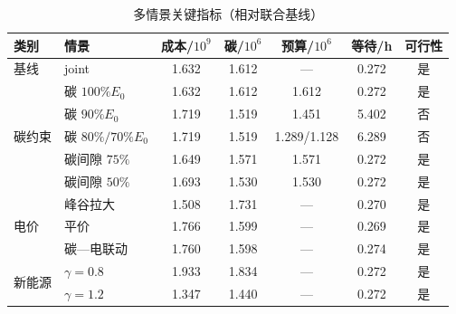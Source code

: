 \documentclass[UTF8,a4paper,zihao=-4]{ctexart}
\begin{document}
\begin{table}[H]
  \centering
  \small
  \caption{多情景关键指标（相对联合基线）}
  \label{tab:q4-scenarios}
  \small
  \setlength{\tabcolsep}{3.5pt}
  \begin{tabular}{llccccc}
    \hline
    类别 & 情景 & 成本/$10^9$ & 碳/$10^6$ & 预算/$10^6$ & 等待/h & 可行性 \\
    \hline
    基线 & joint & 1.632 & 1.612 & --- & 0.272 & 是 \\
    \hline
    \multirow{5}{*}{碳约束}
      & 碳 \(100\%E_0\) & 1.632 & 1.612 & 1.612 & 0.272 & 是 \\
      & 碳 \(90\%E_0\) & 1.719 & 1.519 & 1.451 & 5.402 & 否 \\
      & 碳 \(80\%/70\%E_0\) & 1.719 & 1.519 & 1.289/1.128 & 6.289 & 否 \\
      & 碳间隙 \(75\%\) & 1.649 & 1.571 & 1.571 & 0.272 & 是 \\
      & 碳间隙 \(50\%\) & 1.693 & 1.530 & 1.530 & 0.272 & 是 \\
    \hline
    \multirow{3}{*}{电价}
      & 峰谷拉大 & 1.508 & 1.731 & --- & 0.270 & 是 \\
      & 平价 & 1.766 & 1.599 & --- & 0.269 & 是 \\
      & 碳—电联动 & 1.760 & 1.598 & --- & 0.274 & 是 \\
    \hline
    \multirow{2}{*}{新能源}
      & \(\gamma=0.8\) & 1.933 & 1.834 & --- & 0.272 & 是 \\
      & \(\gamma=1.2\) & 1.347 & 1.440 & --- & 0.272 & 是 \\
    \hline
  \end{tabular}
\end{table}
\end{document}
